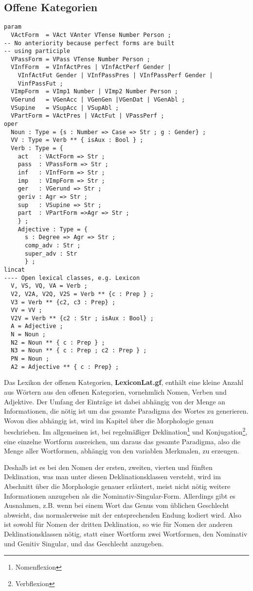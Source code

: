 \subsection{Offene Kategorien}
\label{subsec:offene}
\begin{lstlisting}[float=h!tp,caption={Für \textbf{LexiconLat.gf} nötige \texttt{lincat}-Definitionen für offene Kategorien},label={GF-Lexicon-Lincat},basicstyle=\small]
param 
  VActForm  = VAct VAnter VTense Number Person ;
-- No anteriority because perfect forms are built 
-- using participle
  VPassForm = VPass VTense Number Person ; 
  VInfForm  = VInfActPres | VInfActPerf Gender | 
    VInfActFut Gender | VInfPassPres | VInfPassPerf Gender |
    VinfPassFut ;
  VImpForm  = VImp1 Number | VImp2 Number Person ;
  VGerund   = VGenAcc | VGenGen |VGenDat | VGenAbl ;
  VSupine   = VSupAcc | VSupAbl ;
  VPartForm = VActPres | VActFut | VPassPerf ;
oper
  Noun : Type = {s : Number => Case => Str ; g : Gender} ;
  VV : Type = Verb ** { isAux : Bool } ;
  Verb : Type = {
    act   : VActForm => Str ;
    pass  : VPassForm => Str ;
    inf   : VInfForm => Str ;
    imp   : VImpForm => Str ;
    ger   : VGerund => Str ;
    geriv : Agr => Str ; 
    sup   : VSupine => Str ;
    part  : VPartForm =>Agr => Str ;
    } ;
    Adjective : Type = {
      s : Degree => Agr => Str ;
      comp_adv : Str ; 
      super_adv : Str 
      } ;
lincat
---- Open lexical classes, e.g. Lexicon
  V, VS, VQ, VA = Verb ; 
  V2, V2A, V2Q, V2S = Verb ** {c : Prep } ;
  V3 = Verb ** {c2, c3 : Prep} ;
  VV = VV ;
  V2V = Verb ** {c2 : Str ; isAux : Bool} ;
  A = Adjective ;
  N = Noun ;
  N2 = Noun ** { c : Prep } ;
  N3 = Noun ** { c : Prep ; c2 : Prep } ;
  PN = Noun ;
  A2 = Adjective ** { c : Prep} ;
\end{lstlisting}
Das Lexikon der offenen Kategorien, \textbf{LexiconLat.gf}, enthält eine kleine Anzahl aus Wörtern aus den offenen Kategorien, vornehmlich Nomen, Verben und Adjektive. Der Umfang der Einträge ist dabei abhängig von der Menge an Informationen, die nötig ist um das gesamte Paradigma des Wortes zu generieren. Wovon dies abhängig ist, wird im Kapitel über die Morphologie genau beschrieben. Im allgemeinen ist, bei regelmäßiger Deklination\footnote{Nomenflexion} und Konjugation\footnote{Verbflexion}, eine einzelne Wortform ausreichen, um daraus das gesamte Paradigma, also die Menge aller Wortformen, abhängig von den variablen Merkmalen, zu erzeugen. \par
Deshalb ist es bei den Nomen der ersten, zweiten, vierten und fünften Deklination, was man unter diesen Deklinationsklassen versteht, wird im Abschnitt über die Morphologie genauer erläutert, meist nicht nötig weitere Informationen anzugeben als die Nominativ-Singular-Form. Allerdings gibt es Ausnahmen, z.B. wenn bei einem Wort das Genus vom üblichen Geschlecht abweicht, das normalerweise mit der entsprechenden Endung kodiert wird. Also ist sowohl für Nomen der dritten Deklination, so wie für Nomen der anderen Deklinationsklassen nötig, statt einer Wortform zwei Wortformen, den Nominativ und Genitiv Singular, und das Geschlecht anzugeben. \par
